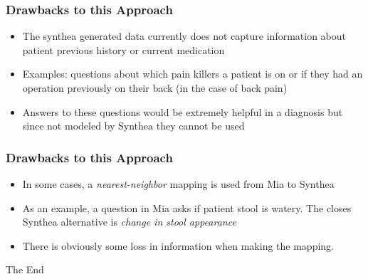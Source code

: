 \documentclass{beamer}
\begin{document}
\frametitle{Drawbacks to this Approach}
\begin{frame}
\begin{itemize}
	\item The synthea generated data currently does not capture information about patient previous history or current medication
	\item Examples: questions about which pain killers a patient is on or if they had an operation previously on their back (in the case of back pain)
	\item Answers to these questions would be extremely helpful in a diagnosis but since not modeled by Synthea they cannot be used
\end{itemize}
\end{frame}

\frametitle{Drawbacks to this Approach}
\begin{frame}
\begin{itemize}
	\item In some cases, a \textit{nearest-neighbor} mapping is used from Mia to Synthea
	\item As an example, a question in Mia asks if patient stool is watery. The closes Synthea alternative is \textit{change in stool appearance}
	\item There is obviously some loss in information when making the mapping.
\end{itemize}
\end{frame}



\begin{frame}
\Huge{\centerline{The End}}
\end{frame}

\end{document}
